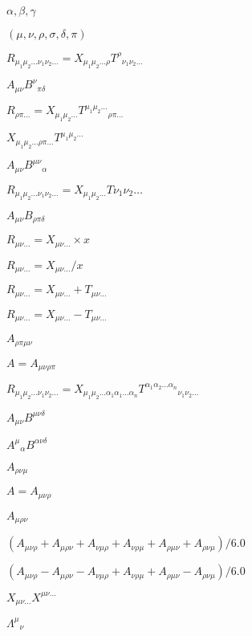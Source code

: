 \documentclass{article}
\begin{document}
$ \alpha,\beta,\gamma $
\pagebreak

$ (\mu,\nu,\rho,\sigma,\delta,\pi) $
\pagebreak

$ R_{\mu_1\mu_2\ldots\nu_1\nu_2\ldots} = X_{\mu_1\mu_2\ldots\rho} T^{\rho}{}_{\nu_1\nu_2\ldots} $
\pagebreak

$ A_{\mu\nu} B^{\nu}{}_{\pi\delta} $
\pagebreak

$ R_{\rho\pi\ldots} = X_{\mu_1\mu_2\ldots} T^{\mu_1\mu_2\ldots}{}_{\rho\pi\ldots} $
\pagebreak

$ X_{\mu_1\mu_2\ldots\rho\pi\ldots} T^{\mu_1\mu_2\ldots} $
\pagebreak

$ A_{\mu\nu} B^{\mu\nu}{}_{\alpha} $
\pagebreak

$ R_{\mu_1\mu_2\ldots\nu_1\nu_2\ldots} = X_{\mu_1\mu_2\ldots} T{\nu_1\nu_2\ldots} $
\pagebreak

$ A_{\mu\nu} B_{\rho\pi\delta} $
\pagebreak

$ R_{\mu\nu\ldots} = X_{\mu\nu\ldots} \times x $
\pagebreak

$ R_{\mu\nu\ldots} = X_{\mu\nu\ldots} / x $
\pagebreak

$ R_{\mu\nu\ldots} = X_{\mu\nu\ldots} + T_{\mu\nu\ldots} $
\pagebreak

$ R_{\mu\nu\ldots} = X_{\mu\nu\ldots} - T_{\mu\nu\ldots} $
\pagebreak

$ A_{\rho\pi\mu\nu} $
\pagebreak

$ A = A_{\mu\nu\rho\pi} $
\pagebreak

$ R_{\mu_1\mu_2\ldots\nu_1\nu_2\ldots} = X_{\mu_1\mu_2\ldots\alpha_1\alpha_1\ldots\alpha_n} T^{\alpha_1\alpha_2\ldots\alpha_n}{}_{\nu_1\nu_2\ldots} $
\pagebreak

$ A_{\mu\nu} B^{\mu\nu\delta} $
\pagebreak

$ A^{\mu}{}_{\alpha} B^{\alpha\nu\delta} $
\pagebreak

$ A_{\rho\nu\mu} $
\pagebreak

$ A = A_{\mu\nu\rho} $
\pagebreak

$ A_{\mu\rho\nu} $
\pagebreak

$ (A_{\mu\nu\rho} + A_{\mu\rho\nu} + A_{\nu\mu\rho} + A_{\nu\rho\mu} + A_{\rho\mu\nu} + A_{\rho\nu\mu})/6.0 $
\pagebreak

$ (A_{\mu\nu\rho} - A_{\mu\rho\nu} - A_{\nu\mu\rho} + A_{\nu\rho\mu} + A_{\rho\mu\nu} - A_{\rho\nu\mu})/6.0 $
\pagebreak

$ X_{\mu\nu...} X^{\mu\nu...} $
\pagebreak

$ \Lambda^{\mu}{}_{\nu}$
\pagebreak
\end{document}
